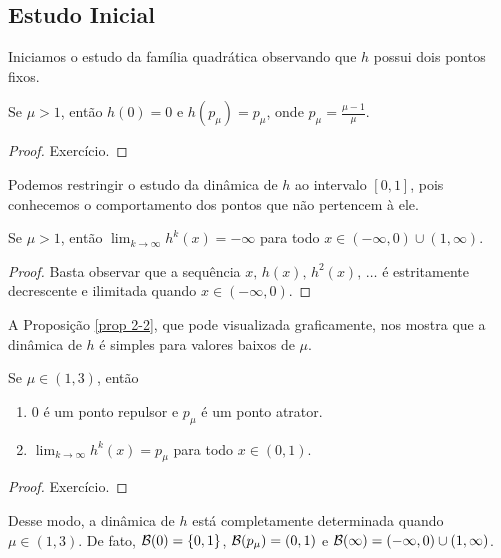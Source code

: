 \subsection{Estudo Inicial}

Iniciamos o estudo da família quadrática observando que $h$ possui dois pontos fixos.

\begin{proposition}
Se $\mu > 1$, então $h(0) = 0$ e $h(p_\mu) = p_\mu$, onde $p_\mu = \frac{\mu-1}{\mu}$.
\end{proposition}

\begin{proof}
Exercício.
\end{proof}

Podemos restringir o estudo da dinâmica de $h$ ao intervalo $[0, 1]$, pois conhecemos o comportamento dos pontos que não pertencem à ele.

\begin{proposition}\label{prop 2-1}
Se $\mu > 1$, então $\lim_{k \to \infty} h^k(x) = - \infty$ para todo $x \in (-\infty, 0) \cup (1, \infty)$.
\end{proposition}

\begin{proof}
Basta observar que a sequência $x, \, h(x), \, h^2(x), \, \dots$ é estritamente decrescente e ilimitada quando $x \in (-\infty, 0)$.
\end{proof}

A Proposição \ref{prop 2-2}, que pode visualizada graficamente, nos mostra que a dinâmica de $h$ é simples para valores baixos de $\mu$.

\begin{proposition}\label{prop 2-2}
Se $\mu \in (1, 3)$, então
\begin{enumerate}
\item $0$ é um ponto repulsor e $p_\mu$ é um ponto atrator.
\item $\lim_{k \to \infty} h^k(x) = p_\mu$ para todo $x \in (0, 1)$.
\end{enumerate}
\end{proposition}

\begin{proof}
Exercício.
\end{proof}

Desse modo, a dinâmica de $h$ está completamente determinada quando $\mu \in (1, 3)$. De fato, $\mathcal{B}(0) = \lbrace 0, 1 \rbrace$, $\mathcal{B}(p_\mu) = (0, 1)$ e $\mathcal{B}(\infty) = (-\infty, 0) \cup (1, \infty)$.
